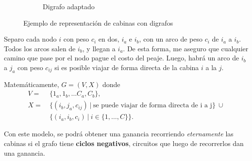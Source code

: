 \documentclass[12pt, a4paper]{report}
\theoremstyle{definition} %
\begin{document}
\begin{enumerate}[a)]
\begin{figure}[H]
\begin{subfigure}[b]{0.4\textwidth}
        \caption{Digrafo adaptado}
    \end{subfigure}
    \caption{Ejemplo de representación de cabinas con digrafos}
    \label{5:adaptado}
\end{figure}

Separo cada nodo $i$ con peso $c_i$ en dos, $i_a$ e $i_b$, con un arco de peso $c_i$ de $i_a$ a $i_b$. Todos los arcos salen de $i_b$, y llegan a $i_a$. De esta forma, me aseguro que cualquier camino que pase por el nodo pague el costo del peaje. Luego, habrá un arco de $i_b$ a $j_a$ con peso $c_{ij}$ si es posible viajar de forma directa de la cabina $i$ a la $j$.

Matemáticamente, $G = (V, X)$ donde
\begin{align*}
    V = \ &\{ 1_a, 1_b, \ldots C_a, C_b\},\\
    X = \ &\{ (i_b, j_a, c_{ij}) \ |\ \text{se puede viajar de forma directa de i a j} \}\ \cup\\
      &\{ (i_a, i_b, c_i) \ | \ i \in \{1, \ldots, C\}\}.
\end{align*}

Con este modelo, se podrá obtener una ganancia recorriendo \textit{eternamente} las cabinas si el grafo tiene \textbf{ciclos negativos}, circuitos que luego de recorrerlos dan una ganancia.

\begin{figure}[H]
    \centering
    \begin{subfigure}[b]{0.4\textwidth}
        \centering
\end{subfigure}
\end{figure}
\end{enumerate}
\end{document}
